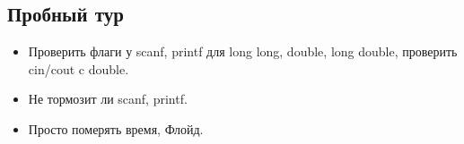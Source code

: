 \subsection{Пробный тур}
\begin{itemize}
    \item Проверить флаги у scanf, printf для long long, double, long double, проверить cin/cout c double.
    \item Не тормозит ли scanf, printf.
    \item Просто померять время, Флойд.
\end{itemize}

